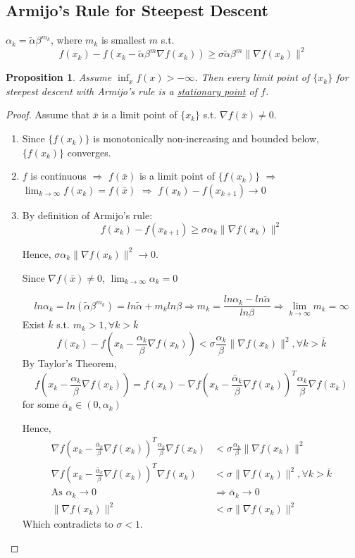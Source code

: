 \documentclass[11pt,a4paper]{article}
\newtheorem{proposition}{Proposition}
\begin{document}
\subsection*{Armijo's Rule for Steepest Descent}
$\alpha_k=\tilde{\alpha}\beta^{m_k}$, where $m_k$ is smallest $m$ s.t. $$f(x_k)-f(x_k-\tilde{\alpha}\beta^{m} \nabla f(x_k))\geq \sigma\tilde{\alpha}\beta^{m}\|\nabla f(x_k)\|^2$$

\begin{proposition}
Assume $\inf_x f(x)>-\infty$. Then every limit point of $\{x_k\}$ for steepest descent with Armijo's rule is a \underline{stationary point} of $f$.
\end{proposition}
\begin{proof}
Assume that $\bar{x}$ is a limit point of $\{x_k\}$ s.t. $\nabla f(\bar{x})\neq 0$.
\begin{enumerate}[$\bullet$]
    \item Since $\{f(x_k)\}$ is monotonically non-increasing and bounded below, $\{f(x_k)\}$ converges.
    \item $f$ is continuous $\Rightarrow$ $f(\bar{x})$ is a limit point of $\{f(x_k)\}$ $\Rightarrow$ $\lim_{k \rightarrow \infty}f(x_k)=f(\bar{x})$ $\Rightarrow$ $f(x_k)-f(x_{k+1})\rightarrow 0$
    \item By definition of Armijo's rule: $$f(x_k)-f(x_{k+1})\geq \sigma\alpha_k\|\nabla f(x_k)\|^2$$
    
    Hence, $\sigma\alpha_k\|\nabla f(x_k)\|^2 \rightarrow 0$.

    Since $\nabla f(\bar{x})\neq 0$, $\lim_{k \rightarrow \infty}\alpha_k=0$

    $$ln\alpha_k=ln (\tilde{\alpha}\beta^{m_k})=ln\tilde{\alpha}+m_kln\beta \Rightarrow	m_k=\frac{ln\alpha_k-ln\tilde{\alpha}}{ln\beta}\Rightarrow \lim_{k \rightarrow \infty}m_k=\infty$$
    Exist $\bar{k}$ s.t. $m_k>1,\forall k>\bar{k}$
    $$f(x_k)-f(x_k-\frac{\alpha_k}{\beta}\nabla f(x_k))<\sigma\frac{\alpha_k}{\beta}\|\nabla f(x_k)\|^2,\forall k>\bar{k}$$
    By Taylor's Theorem,
    $$f(x_k-\frac{\alpha_k}{\beta}\nabla f(x_k))=f(x_k)-\nabla f(x_k-\frac{\bar{\alpha}_k}{\beta}\nabla f(x_k))^T\frac{\alpha_k}{\beta}\nabla f(x_k)$$ for some $\bar{\alpha}_k\in(0,\alpha_k)$

    Hence, \begin{equation}
        \begin{aligned}
            \nabla f(x_k-\frac{\bar{\alpha}_k}{\beta}\nabla f(x_k))^T\frac{\alpha_k}{\beta}\nabla f(x_k)&<\sigma\frac{\alpha_k}{\beta}\|\nabla f(x_k)\|^2\\
            \nabla f(x_k-\frac{\bar{\alpha}_k}{\beta}\nabla f(x_k))^T\nabla f(x_k)&<\sigma\|\nabla f(x_k)\|^2,
            \forall k>\bar{k}\\
            \text{As }\alpha_k \rightarrow 0& \Rightarrow \bar{\alpha}_k\rightarrow 0\\
            \|\nabla f(x_k)\|^2&<\sigma\|\nabla f(x_k)\|^2
        \end{aligned}
        \nonumber
    \end{equation}
    Which contradicts to $\sigma<1$.
\end{enumerate}
\end{proof}
\end{document}
